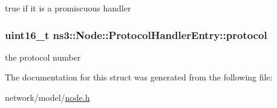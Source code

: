 true if it is a promiscuous handler 

\subsubsection[{\texorpdfstring{protocol}{protocol}}]{\setlength{\rightskip}{0pt plus 5cm}uint16\+\_\+t ns3\+::\+Node\+::\+Protocol\+Handler\+Entry\+::protocol}\hypertarget{structns3_1_1Node_1_1ProtocolHandlerEntry_a15aa93b69f35fe872e74fdfa88760723}{}\label{structns3_1_1Node_1_1ProtocolHandlerEntry_a15aa93b69f35fe872e74fdfa88760723}


the protocol number 



The documentation for this struct was generated from the following file\+:\begin{DoxyCompactItemize}
\item 
network/model/\hyperlink{node_8h}{node.\+h}\end{DoxyCompactItemize}
